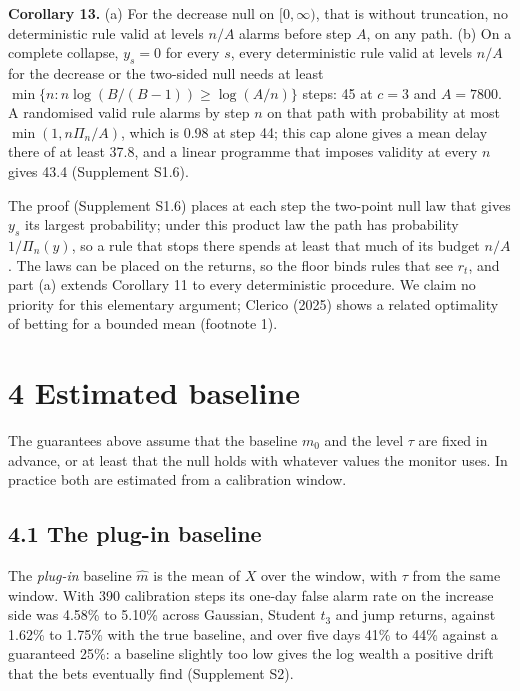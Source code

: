 \documentclass[
]{article}
\begin{document}
\textbf{Corollary 13.} (a) For the decrease null on \([0, \infty)\),
that is without truncation, no deterministic rule valid at levels
\(n/A\) alarms before step \(A\), on any path. (b) On a complete
collapse, \(y_s = 0\) for every \(s\), every deterministic rule valid at
levels \(n/A\) for the decrease or the two-sided null needs at least
\(\min\lbrace n : n \log(B/(B-1)) \ge \log(A/n)\rbrace\) steps: 45 at
\(c = 3\) and \(A = 7800\). A randomised valid rule alarms by step \(n\)
on that path with probability at most \(\min(1, n\Pi_n/A)\), which is
0.98 at step 44; this cap alone gives a mean delay there of at least
37.8, and a linear programme that imposes validity at every \(n\) gives
43.4 (Supplement S1.6).

The proof (Supplement S1.6) places at each step the two-point null law
that gives \(y_s\) its largest probability; under this product law the
path has probability \(1/\Pi_n(y)\), so a rule that stops there spends
at least that much of its budget \(n/A\). The laws can be placed on the
returns, so the floor binds rules that see \(r_t\), and part (a) extends
Corollary 11 to every deterministic procedure. We claim no priority for
this elementary argument; Clerico (2025) shows a related optimality of
betting for a bounded mean (footnote 1).

\hypertarget{estimated-baseline}{%
\section{4 Estimated baseline}\label{estimated-baseline}}

The guarantees above assume that the baseline \(m_0\) and the level
\(\tau\) are fixed in advance, or at least that the null holds with
whatever values the monitor uses. In practice both are estimated from a
calibration window.

\hypertarget{the-plug-in-baseline}{%
\subsection{4.1 The plug-in baseline}\label{the-plug-in-baseline}}

The \emph{plug-in} baseline \(\hat m\) is the mean of \(X\) over the
window, with \(\tau\) from the same window. With 390 calibration steps
its one-day false alarm rate on the increase side was 4.58\% to 5.10\%
across Gaussian, Student \(t_3\) and jump returns, against 1.62\% to
1.75\% with the true baseline, and over five days 41\% to 44\% against a
guaranteed 25\%: a baseline slightly too low gives the log wealth a
positive drift that the bets eventually find (Supplement S2).
\end{document}
